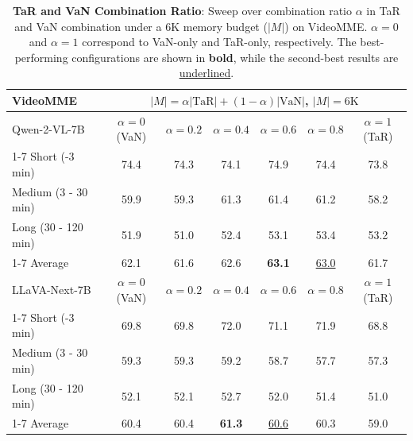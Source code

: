 \clearpage
\setcounter{figure}{0}
\setcounter{equation}{0}
\setcounter{table}{0}
\setcounter{section}{0}
\appendix





\begin{table}[t]
\centering
\small
\begin{tabular}{lcccccc}
\toprule
VideoMME  &\multicolumn{6}{c}{$|M| = \alpha |\text{TaR}| + (1-\alpha) |\text{VaN}|$, $|M| = 6\text{K}$} \\ \midrule
Qwen-2-VL-7B & $\alpha=0$ (VaN) & $\alpha=0.2$ & $\alpha=0.4$ & $\alpha=0.6$ & $\alpha=0.8$ & $\alpha=1$ (TaR) \\
\cmidrule(lr){1-7}
Short (-3 min) & 74.4 & 74.3 & 74.1 & 74.9 & 74.4 & 73.8 \\
Medium (3 - 30 min)  & 59.9 & 59.3 & 61.3 & 61.4 & 61.2 & 58.2 \\
Long (30 - 120 min)  & 51.9 & 51.0 & 52.4 & 53.1 & 53.4 & 53.2 \\ \cmidrule(lr){1-7}
Average  & 62.1 & 61.6 & 62.6 & \textbf{63.1} & \underline{63.0} & 61.7 \\
\midrule
LLaVA-Next-7B & $\alpha=0$ (VaN) & $\alpha=0.2$ & $\alpha=0.4$ & $\alpha=0.6$ & $\alpha=0.8$ & $\alpha=1$ (TaR) \\
\cmidrule(lr){1-7}
Short (-3 min)   & 69.8 & 69.8 & 72.0 & 71.1 & 71.9 & 68.8 \\
Medium (3 - 30 min)     & 59.3 & 59.3 & 59.2 & 58.7 & 57.7 & 57.3 \\
Long (30 - 120 min)    & 52.1 & 52.1 & 52.7 & 52.0 & 51.4 & 51.0 \\ \cmidrule(lr){1-7}
Average    & 60.4 & 60.4 & \textbf{61.3} & \underline{60.6} & 60.3 & 59.0 \\
\bottomrule
\end{tabular}
\vspace{2mm}
\caption{\textbf{TaR and VaN Combination Ratio}: Sweep over combination ratio $\alpha$ in TaR and VaN combination under a 6K memory budget ($|M|$) on VideoMME. $\alpha{=}0$ and $\alpha{=}1$ correspond to VaN-only and TaR-only, respectively. The best-performing configurations are shown in \textbf{bold}, while the second-best results are \underline{underlined}.}
\label{tab:alpha_sweep}
\vspace{-.15in}
\end{table}


